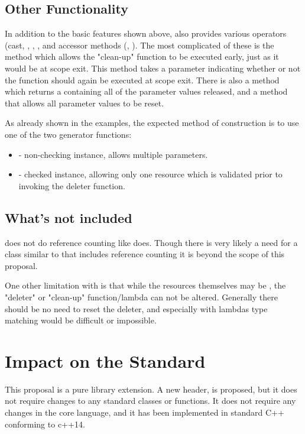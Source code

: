\documentclass[ebook,11pt,article]{memoir}
\begin{document}
\section{Other Functionality}
In addition to the basic features shown above,  also provides various operators (cast, \tcode{->}, \tcode{()}, \tcode{*}, and accessor methods (, ).  The most complicated of these is the  method which allows the "clean-up" function to be executed early, just as it would be at scope exit.  This method takes a parameter indicating whether or not the function should again be executed at scope exit.  There is also a  method which returns a  containing all of the parameter values released, and a  method that allows all parameter values to be reset.

As already shown in the examples, the expected method of construction is to use one of the two generator functions:
\begin{itemize}
\item {} - non-checking instance, allows multiple parameters.
\item {} - checked instance, allowing only one resource which is validated prior to invoking the deleter function.
\end{itemize}

\section{What's not included}
 does not do reference counting like  does.  Though there is very likely a need for a class similar to  that includes reference counting it is beyond the scope of this proposal.

One other limitation with  is that while the resources themselves may be , the "deleter" or "clean-up" function/lambda can not be altered.  Generally there should be no need to reset the deleter, and especially with lambdas type matching would be difficult or impossible.

\chapter{Impact on the Standard}
This proposal is a pure library extension. A new header,  is proposed, but it does not require changes to any standard classes or functions. It does not require any changes in the core language, and it has been implemented in standard C++ conforming to c++14.
\end{document}
